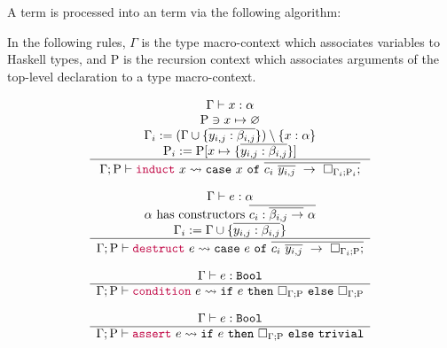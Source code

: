 A \LangA term is processed into an \LangB term via the following algorithm:

\newcommand{\Rho}{\mathrm{P}}
\newcommand{\expandsTo}{\rightsquigarrow}
\newcommand{\macroHole}[2]{\Box_{#1 ; #2}}

In the following rules, $\Gamma$ is the type macro-context which associates
variables to Haskell types, and $\Rho$ is the recursion context which associates
arguments of the top-level declaration to a type macro-context.

\begin{figure*}
{\centering
\[
\begin{array}{c}
  \Gamma \vdash x : \alpha \\
  \Rho \ni x \mapsto \varnothing \\
  \Gamma_i := (\Gamma \cup \{\overline{y_{i,j}:\beta_{i,j}}\}) \setminus \{x:\alpha\} \\
  \Rho_i := \Rho[ x \mapsto \{\overline{y_{i,j}:\beta_{i,j}}\} ] \\
  \hline \\[-1em] 
  \Gamma; \Rho 
  \vdash
  \macro{induct} ~ x
  \expandsTo 
  \MC{case} ~ x ~ \MC{of} ~ 
  \overline{
    c_i ~ \overline{y_{i,j}} ~ \rightarrow ~ 
    \macroHole
      {\Gamma_i}
      {\Rho_i};
  }
\\[1em]
  \Gamma \vdash e : \alpha \\
  \alpha ~ \text{has constructors} ~ \overline{c_i : \overline{\beta_{i,j} \rightarrow} ~ \alpha} \\
  \Gamma_i := \Gamma \cup \{\overline{y_{i,j}:\beta_{i,j}}\} \\
  \hline \\[-1em] 
  \Gamma; \Rho
  \vdash
  \macro{destruct} ~ e
  \expandsTo 
  \MC{case} ~ e ~ \MC{of} ~
  \overline{
    c_i ~ \overline{y_{i,j}} ~ \rightarrow ~ 
    \macroHole
      {\Gamma_i}
      {\Rho};
  }
\\[1em]
  \Gamma \vdash e:\MC{Bool} \\
  \hline
  \Gamma; \Rho
  \vdash
  \macro{condition} ~ e
  \expandsTo
  \MC{if} ~ e ~ \MC{then} ~ \macroHole{\Gamma}{\Rho} ~ \MC{else} ~ \macroHole{\Gamma}{\Rho}
\\[1em]
  \Gamma \vdash e:\MC{Bool} \\
  \hline
  \Gamma; \Rho
  \vdash
  \macro{assert} ~ e
  \expandsTo
  \MC{if} ~ e ~ \MC{then} ~ \macroHole{\Gamma}{\Rho} ~ \MC{else} ~ \MC{trivial}

\end{array}\]}
\end{figure*}
